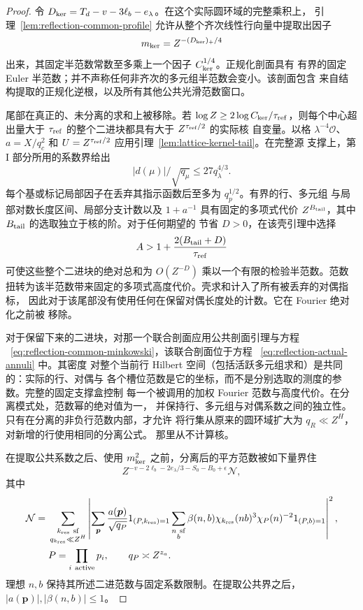 \documentclass[11pt,a4paper]{article}
\numberwithin{equation}{section}
\numberwithin{figure}{section}
\theoremstyle{definition}
\theoremstyle{remark}
\begin{document}
\begin{proof}
令 \(D_{\rm ker}=T_d-v-3\ell_b-e_\lambda\)。在这个实际圆环域的完整乘积上，
引理~\ref{lem:reflection-common-profile} 允许从整个齐次线性行向量中提取出因子
\[
 m_{\rm ker}=Z^{-(D_{\rm ker})_+/4}
\]
出来，其固定半范数常数至多乘上一个因子 \(C_{\rm ker}^{1/4}\)。正规化剖面具有
有界的固定 Euler 半范数；并不声称任何非齐次的多元组半范数会变小。该剖面包含
来自结构提取的正规化逆根，以及所有其他公共光滑范数窗口。

尾部在真正的、未分离的求和上被移除。若
\(\log Z\ge2\log C_{\rm ker}/\tau_{\rm ref}\)，则每个中心超出量大于
\(\tau_{\rm ref}\) 的整个二进块都具有大于 \(Z^{\tau_{\rm ref}/2}\) 的实际核
自变量。以格 \(\lambda^{-4}\mathcal O\)、\(a=X/q_c^2\) 和
\(U=Z^{\tau_{\rm ref}/2}\) 应用引理~\ref{lem:lattice-kernel-tail}。在完整源
支撑上，第 I 部分所用的系数界给出
\[
 |d(\mu)|/\sqrt{q_\mu}\le27q_\lambda^{4/3}.
\]
每个基或标记局部因子在丢弃其指示函数后至多为 \(q_p^{1/2}\)。有界的行、多元组
与局部对数长度区间、局部分支计数以及 \(1+a^{-1}\) 具有固定的多项式代价
\(Z^{B_{\rm tail}}\)，其中 \(B_{\rm tail}\) 的选取独立于核的阶。对于任何期望的
节省 \(D>0\)，在该壳引理中选择
\[
 A>1+\frac{2(B_{\rm tail}+D)}{\tau_{\rm ref}}
\]
可使这些整个二进块的绝对总和为 \(O(Z^{-D})\) 乘以一个有限的检验半范数。范数
扭转为该半范数带来固定的多项式高度代价。壳求和计入了所有被丢弃的对偶指标，
因此对于该尾部没有使用任何在保留对偶长度处的计数。它在 Fourier 绝对化之前被
移除。

对于保留下来的二进块，对那一个联合剖面应用公共剖面引理与方程
~\eqref{eq:reflection-common-minkowski}，该联合剖面位于方程
~\eqref{eq:reflection-actual-annuli} 中。其密度
对整个当前行 Hilbert 空间（包括活跃多元组求和）是共同的：实际的行、对偶与
各个槽位范数是它的坐标，而不是分别选取的测度的参数。完整的固定支撑盒控制
每一个被调用的加权 Fourier 范数与高度代价。在分离模式处，范数幂的绝对值为一，
并保持行、多元组与对偶系数之间的独立性。只有在分离的非负行范数内部，才允许
将行集从原来的圆环域扩大为 \(q_R\ll Z^H\)，对新增的行使用相同的分离公式。
那里从不计算核。

在提取公共系数之后、使用 \(m_{\rm ker}^2\) 之前，分离后的平方范数被如下量界住
\[
 Z^{-v-2\ell_b-2e_\lambda/3-S_0-B_0+\epsilon}\mathcal N,
\]
其中
\begin{equation}\label{old-eq:4.6a}
 \begin{split}
 \mathcal N={}&
 \sum_{\substack{k_{\rm res}\ {\rm sf}\\q_{k_{\rm res}}\ll Z^H}}
 \left|
 \sum_{\boldsymbol p}
 \frac{a(\boldsymbol p)}{\sqrt{q_P}}1_{(P,k_{\rm res})=1}
 \sum_{\substack{n\ {\rm sf}\\b}}
 \beta(n,b)\chi_{k_{\rm res}}(nb)^3
              \chi_P(n)^{-2}1_{(P,b)=1}
 \right|^2,\\
 &P=\prod_{i\ {\rm active}}p_i,\qquad q_P\asymp Z^{z_a}.
 \end{split}
\end{equation}
理想 \(n,b\) 保持其所述二进范数与固定系数限制。在提取公共界之后，
\(|a(\boldsymbol p)|,|\beta(n,b)|\le1\)。


\end{proof}
\end{document}
